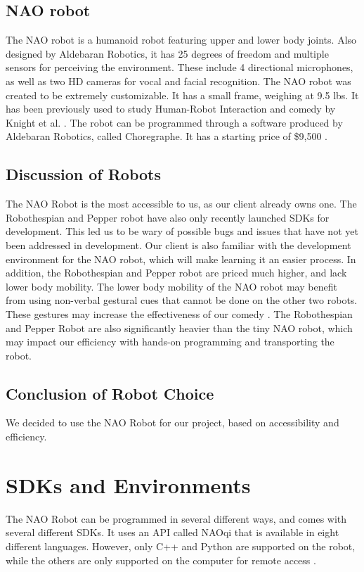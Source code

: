 \documentclass[onecolumn, draftclsnofoot,10pt, compsoc]{IEEEtran}
\begin{document}
\subsection{NAO robot}
The NAO robot is a humanoid robot featuring upper and lower body joints.
Also designed by Aldebaran Robotics, it has 25 degrees of freedom and multiple sensors for perceiving the environment.
These include 4 directional microphones, as well as two HD cameras for vocal and facial recognition.
The NAO robot was created to be extremely customizable.
It has a small frame, weighing at 9.5 lbs.
It has been previously used to study Human-Robot Interaction and comedy by Knight et al. \cite{KnightSavvy:2011}.
The robot can be programmed through a software produced by Aldebaran Robotics, called Choregraphe.
It has a starting price of \$9,500 \cite{BuyNAO}. \cite{NAORobot}

\subsection{Discussion of Robots}
The NAO Robot is the most accessible to us, as our client already owns one.
The Robothespian and Pepper robot have also only recently launched SDKs for development.
This led us to be wary of possible bugs and issues that have not yet been addressed in development.
Our client is also familiar with the development environment for the NAO robot, which will make learning it an easier process.
In addition, the Robothespian and Pepper robot are priced much higher, and lack lower body mobility.
The lower body mobility of the NAO robot may benefit from using non-verbal gestural cues that cannot be done on the other two robots.
These gestures may increase the effectiveness of our comedy \cite{KnightEightLessons:2011}.
The Robothespian and Pepper Robot are also significantly heavier than the tiny NAO robot, which may impact our efficiency with hands-on programming and transporting the robot.

\subsection{Conclusion of Robot Choice}
We decided to use the NAO Robot for our project, based on accessibility and efficiency.

\section{SDKs and Environments}
The NAO Robot can be programmed in several different ways, and comes with several different SDKs. It uses an API called NAOqi that is available in eight different languages. However, only C++ and Python are supported on the robot, while the others are only supported on the computer for remote access \cite{NAOSDK:Overview}.
\end{document}
